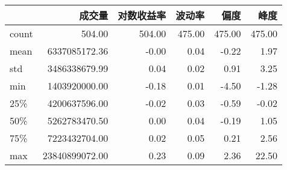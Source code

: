 \begin{tabular}{lrrrrr}
\toprule
{} &            成交量 &  对数收益率 &    波动率 &     偏度 &     峰度 \\
\midrule
count &         504.00 & 504.00 & 475.00 & 475.00 & 475.00 \\
mean  &  6337085172.36 &  -0.00 &   0.04 &  -0.22 &   1.97 \\
std   &  3486338679.99 &   0.04 &   0.02 &   0.91 &   3.25 \\
min   &  1403920000.00 &  -0.18 &   0.01 &  -4.50 &  -1.28 \\
25\%   &  4200637596.00 &  -0.02 &   0.03 &  -0.59 &  -0.02 \\
50\%   &  5262783470.50 &   0.00 &   0.04 &  -0.19 &   1.05 \\
75\%   &  7223432704.00 &   0.02 &   0.05 &   0.21 &   2.56 \\
max   & 23840899072.00 &   0.23 &   0.09 &   2.36 &  22.50 \\
\bottomrule
\end{tabular}
